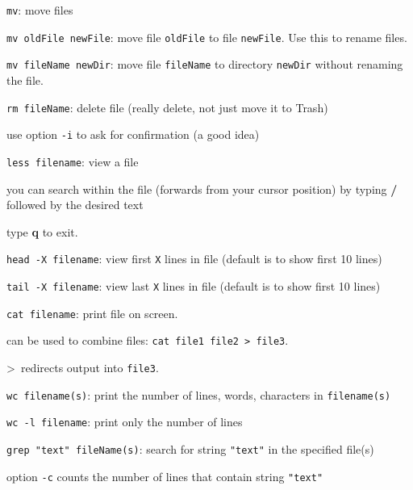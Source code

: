 \documentclass[11pt]{article}
\begin{document}
\texttt{mv}: move files
\vspace{-2mm}
\begin{itemize*}
\item \texttt{mv oldFile newFile}: move file \texttt{oldFile} to file \texttt{newFile}. Use this to rename files.
\item \texttt{mv fileName newDir}: move file \texttt{fileName} to directory \texttt{newDir} without renaming the file.
\end{itemize*}

\texttt{rm fileName}: delete file (really delete, not just move it to Trash)
\vspace{-2mm}
\begin{itemize*}
\item use option \texttt{-i} to ask for confirmation (a good idea)
\end{itemize*}

\texttt{less filename}: view a file
\vspace{-2mm}
\begin{itemize*}
\item you can search within the file (forwards from your cursor position) by typing \textbf{/} followed by the desired text
\item type \textbf{q} to exit.
\end{itemize*}

\texttt{head -X filename}: view first \texttt{X} lines in file (default is to show first 10 lines)

\texttt{tail -X filename}: view last \texttt{X} lines in file (default is to show first 10 lines)

\texttt{cat filename}: print file on screen. 
\vspace{-2mm}
\begin{itemize*}
\item can be used to combine files: \texttt{cat file1 file2 \textgreater\  file3}.
\item \textgreater  \ redirects output into \texttt{file3}.
\end{itemize*}

\texttt{wc filename(s)}: print the number of lines, words, characters in \texttt{filename(s)}
\vspace{-2mm}
\begin{itemize*}
\item \texttt{wc -l filename}: print only the number of lines
\end{itemize*}

\texttt{grep "text" fileName(s)}: search for string \texttt{"text"} in the specified file(s)
\vspace{-2mm}
\begin{itemize*}
\item option \texttt{-c} counts the number of lines that contain string \texttt{"text"}\\
\end{itemize*}
\end{document}
